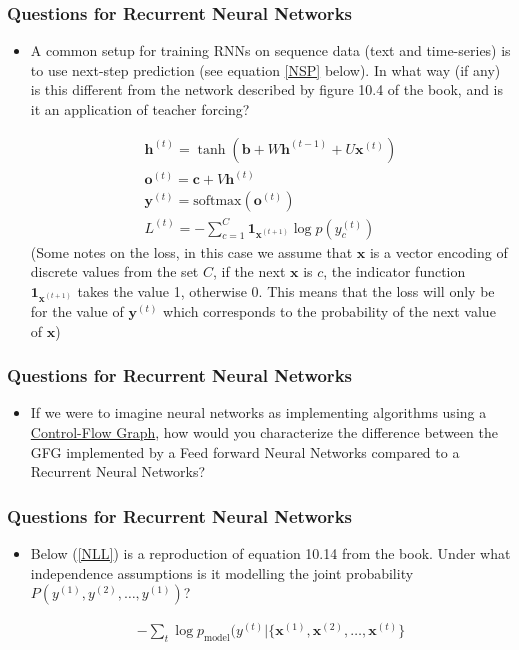 \documentclass{beamer}
\renewcommand{\vec}[1]{{\boldsymbol{#1}}}
\newcommand{\tvec}[2]{{\vec{#1}^{(#2)}}}
\begin{document}
\begin{frame}
\frametitle{Questions for Recurrent Neural Networks}
\begin{itemize}

  \item
  A common setup for training RNNs on sequence data (text and time-series) is to use next-step prediction (see equation \ref{NSP} below). In what way (if any) is this different from the network described by figure 10.4 of the book, and is it an application of teacher forcing?

  \begin{equation}
    \label{NSP}
    \begin{gathered}
      \tvec{h}{t} = \tanh(\vec{b} + W \tvec{h}{t-1} + U\tvec{x}{t})\\
    \tvec{o}{t} = \vec{c} + V\tvec{h}{t}\\
    \tvec{y}{t} = \text{softmax}(\tvec{o}{t})\\
    L^{(t)} = -\sum_{c=1}^C \vec{1}_{\tvec{x}{t+1}} \log p(y_c^{(t)})
\end{gathered}
  \end{equation}
  \scriptsize
  (Some notes on the loss, in this case we assume that $\vec{x}$ is a vector encoding of discrete values from the set $C$, if the next $\vec{x}$ is $c$, the indicator function
  $\vec{1}_{\tvec{x}{t+1}}$ takes the value 1, otherwise 0. This means that the loss
    will only be for the value of $\tvec{y} {t}$ which corresponds to the
    probability of the next value of $\vec{x}$)
\end{itemize}
\end{frame}

\begin{frame}
\frametitle{Questions for Recurrent Neural Networks}
\begin{itemize}

    \item  If we were to imagine neural networks as implementing algorithms using a \href{https://en.wikipedia.org/wiki/Control-flow_graph}{Control-Flow Graph}, how would you characterize the difference between the GFG implemented by a Feed forward Neural Networks compared to a Recurrent Neural Networks?
\end{itemize}
\end{frame}


\begin{frame}
\frametitle{Questions for Recurrent Neural Networks}
\begin{itemize}

  \item Below (\ref{NLL}) is a reproduction of equation 10.14 from the book. Under what independence assumptions is it modelling the joint probability $P(y^{(1)}, y^{(2)}, \ldots, y^{(1)})$?

  \begin{equation}
    \label{NLL}
    \begin{gathered}
      -\sum_t \log p_{\text{model}}(y^{(t)} | \{\tvec{x}{1}, \tvec{x}{2}, \ldots, \tvec{x}{t}\}
\end{gathered}
\end{equation}

  \end{itemize}
\end{frame}
\end{document}
